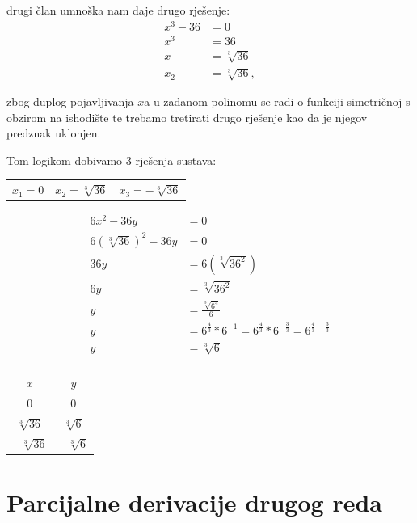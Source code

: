 \documentclass[12pt,a4paper]{report}
\begin{document}
drugi član umnoška nam daje drugo rješenje:
\begin{align*}
    x^3 - 36 &= 0 \\
    x^3 &= 36 \\
    x &= \sqrt[3]{36} \\
    x_2 &= \sqrt[3]{36},
\end{align*}

zbog duplog pojavljivanja $x$a u zadanom polinomu se radi o funkciji simetričnoj s obzirom na ishodište te trebamo tretirati drugo rješenje kao da je njegov predznak uklonjen.

Tom logikom dobivamo 3 rješenja sustava:
\begin{center}
\begin{tabular}{c c c}
    $x_1 = 0$ & $x_2 = \sqrt[3]{36}$ & $x_3 = -\sqrt[3]{36}$\\
\end{tabular}
\end{center}

\begin{align*}
    6x^2 - 36y &= 0\\
    6(\sqrt[3]{36})^2 - 36y &= 0\\
    36y &= 6(\sqrt[3]{36^2})\\
    6y &= \sqrt[3]{36^2} \\
    y &= \frac{\sqrt[3]{6^4}}{6} \\
    y &= 6^{\frac{4}{3}} * 6^{-1} = 6^{\frac{4}{3}} * 6^{-\frac{3}{3}} = 6^{\frac{4}{3} - \frac{3}{3}} \\
    y &= \sqrt[3]6 \\
\end{align*}

\begin{center}
\begin{tabular}{c c}
    $x$ & $y$ \\
    $0$ & $0$ \\
    $\sqrt[3]{36}$ & $\sqrt[3]6$ \\
    $-\sqrt[3]{36}$ & $-\sqrt[3]6$ \\
\end{tabular}
\end{center}

\section{Parcijalne derivacije drugog reda}
\end{document}
